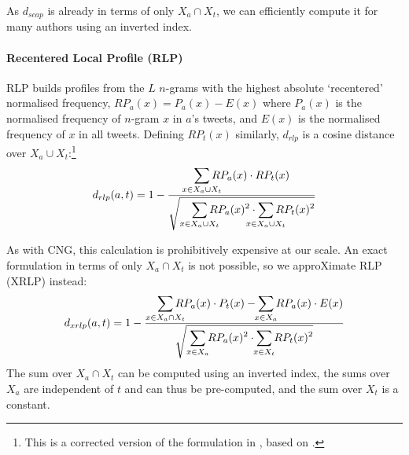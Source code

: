 \documentclass[twocolumn,10pt]{article}
\begin{document}
As $d_{scap}$ is already in terms of only $X_a \cap X_t$, we can
efficiently compute it for many authors using an inverted index.

\paragraph{Recentered Local Profile (RLP)}
\label{par:rlp}
RLP\supercite{layton2012recentred} builds profiles
from the $L$ $n$-grams with the highest absolute `recentered'
normalised frequency,
$RP_a(x) = P_a(x) - E(x)$
where $P_a(x)$ is the normalised frequency of $n$-gram $x$ in
$a$'s tweets, and
$E(x)$ is the normalised frequency of $x$ in all tweets.
Defining $RP_t(x)$ similarly, 
$d_{rlp}$ is a cosine distance over
$X_a \cup X_t$:\footnote{
This is a corrected version of the formulation in \cite{layton2012recentred},
based on \cite{layton2014tutorial}.}
$$
d_{rlp}(a, t) = 1 -
\frac{\displaystyle
    \smashoperator{\sum_{x \in X_a \cup X_t}}
        RP_a(x) \cdot RP_t(x)
}{\displaystyle
    \sqrt{\smashoperator[r]{\sum_{x \in X_a \cup X_t}} RP_a(x)^2
    \cdot \smashoperator{\sum_{x \in X_a \cup X_t}} RP_t(x)^2}
}
$$

As with CNG, this calculation is prohibitively expensive at our scale.
An exact formulation in terms of only $X_a \cap X_t$ is not possible,
so we approXimate RLP (XRLP) instead\footnotemark:
$$
d_{xrlp}(a, t) = 1 -
\frac{\displaystyle
    \smashoperator[r]{\sum_{x \in X_a \cap X_t}}
        RP_a(x) \cdot P_t(x)
    - \smashoperator{\sum_{x \in X_a}}
        RP_a(x) \cdot E(x)
}{\displaystyle
    \sqrt{\smashoperator[r]{\sum_{x \in X_a}} RP_a(x)^2
    \cdot \smashoperator{\sum_{x \in X_t}} RP_t(x)^2}
}
$$
The sum over $X_a \cap X_t$ can be computed using an inverted index,
the sums over $X_a$ are independent of $t$ and can thus be pre-computed,
and the sum over $X_t$ is a constant.

\end{document}
